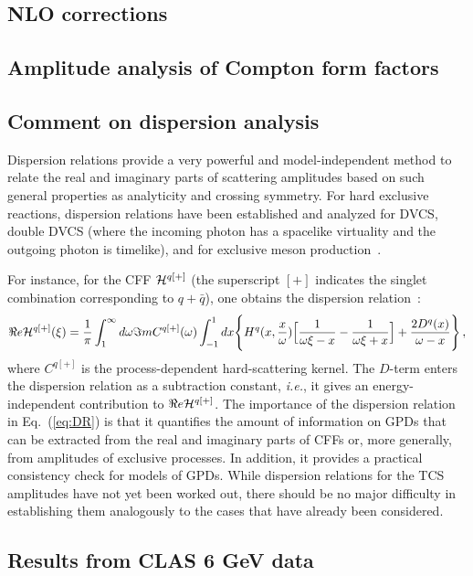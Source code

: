 \subsection{NLO corrections}
\label{subsec:NLO}



\subsection{Amplitude analysis of Compton form factors}
\label{subsec:amplitude_analysis}


\subsection{Comment on dispersion analysis}
\label{subsec:dispersion}

Dispersion relations provide a very powerful and model-independent method
to relate the real and imaginary parts of scattering amplitudes based on
such general properties as analyticity and crossing symmetry. For hard
exclusive reactions, dispersion relations have been established and analyzed
for DVCS, double DVCS (where the incoming photon has a spacelike virtuality
and the outgoing photon is timelike), and for exclusive meson
production~\cite{Anikin:2007yh,Diehl:2007jb,Polyakov:2007rv}.

For instance, for the CFF ${\cal H}^{q[+]}$ (the superscript $[+]$
indicates the singlet combination corresponding to $q+{\bar q}$), 
one obtains the dispersion relation~\cite{Diehl:2007jb}:
\begin{equation}
\Re e {\cal H}^{q[+]}(\xi)=\frac{1}{\pi} \int^{\infty}_{1} d\omega \Im m C^{q[+]}(\omega) \int^{1}_{-1}dx \Bigg\{H^q(x,\frac{x}{\omega})\Big[\frac{1}{\omega \xi -x}-\frac{1}{\omega \xi+x}\Big]+\frac{2 D^q(x)}{\omega-x} \Bigg\} \,,
\label{eq:DR}
\end{equation}
where $C^{q[+]}$ is the process-dependent hard-scattering kernel.
The $D$-term enters the dispersion relation as a subtraction constant,
\textit{i.e.}, it gives an energy-independent contribution to
$\Re e {\cal H}^{q[+]}$.
The importance of the dispersion relation in Eq.~(\ref{eq:DR}) 
is that it quantifies the amount of information on GPDs that can be 
extracted from the real and imaginary parts of CFFs or, more generally, 
from amplitudes of exclusive processes. In addition, it provides a
practical consistency check for models of GPDs.
While dispersion relations for the TCS amplitudes have not yet been worked
out, there should be no major difficulty in establishing them analogously
to the cases that have already been considered.




\subsection{Results from CLAS 6 GeV data}
\label{subsec:tcs6GeV}

